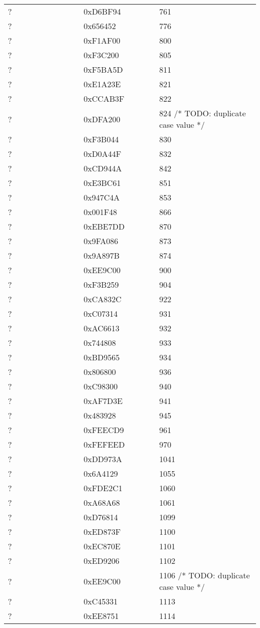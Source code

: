 \begin{longtable}{p{0.3\linewidth} p{0.3\linewidth} p{0.4\linewidth}}
? &  0xD6BF94 &  761\\
? &  0x656452 &  776\\
? &  0xF1AF00 &  800\\
? &  0xF3C200 &  805\\
? &  0xF5BA5D &  811\\
? &  0xE1A23E &  821\\
? &  0xCCAB3F &  822\\
? &  0xDFA200 &  824 /* TODO: duplicate case value */\\
? &  0xF3B044 &  830\\
? &  0xD0A44F &  832\\
? &  0xCD944A &  842\\
? &  0xE3BC61 &  851\\
? &  0x947C4A &  853\\
? &  0x001F48 &  866\\
? &  0xEBE7DD &  870\\
? &  0x9FA086 &  873\\
? &  0x9A897B &  874\\
? &  0xEE9C00 &  900\\
? &  0xF3B259 &  904\\
? &  0xCA832C &  922\\
? &  0xC07314 &  931\\
? &  0xAC6613 &  932\\
? &  0x744808 &  933\\
? &  0xBD9565 &  934\\
? &  0x806800 &  936\\
? &  0xC98300 &  940\\
? &  0xAF7D3E &  941\\
? &  0x483928 &  945\\
? &  0xFEECD9 &  961\\
? &  0xFEFEED &  970\\
? &  0xDD973A &  1041\\
? &  0x6A4129 &  1055\\
? &  0xFDE2C1 &  1060\\
? &  0xA68A68 &  1061\\
? &  0xD76814 &  1099\\
? &  0xED873F &  1100\\
? &  0xEC870E &  1101\\
? &  0xED9206 &  1102\\
? &  0xEE9C00 &  1106 /* TODO: duplicate case value */\\
? &  0xC45331 &  1113\\
? &  0xEE8751 &  1114\\

\end{longtable}
